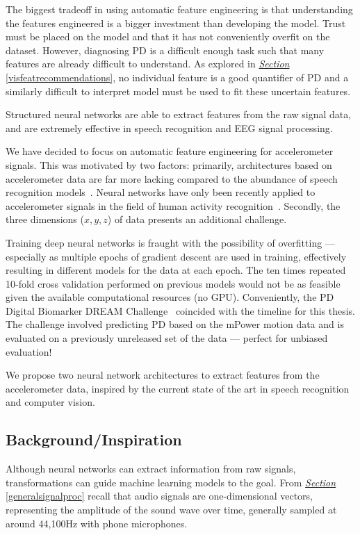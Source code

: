 \documentclass[12pt, twoside]{book}
\begin{document}
The biggest tradeoff in using automatic feature engineering is that understanding the features engineered is a bigger investment than developing the model. Trust must be placed on the model and that it has not conveniently overfit on the dataset. However, diagnosing PD is a difficult enough task such that many features are already difficult to understand. As explored in \textit{\hyperref[visfeatrecommendations]{Section}} \ref{visfeatrecommendations}, no individual feature is a good quantifier of PD and a similarly difficult to interpret model must be used to fit these uncertain features.

\begin{highlight}
	Structured neural networks are able to extract features from the raw signal data, and are extremely effective in speech recognition and EEG signal processing.
\end{highlight}

We have decided to focus on automatic feature engineering for accelerometer signals. This was motivated by two factors: primarily, architectures based on accelerometer data are far more lacking compared to the abundance of speech recognition models~\cite{convlstm, wavenet}. Neural networks have only been recently applied to accelerometer signals in the field of human activity recognition~\cite{deepconvlstm}. Secondly, the three dimensions ($x,y,z$) of data presents an additional challenge.

Training deep neural networks is fraught with the possibility of overfitting --- especially as multiple epochs of gradient descent are used in training, effectively resulting in different models for the data at each epoch. The ten times repeated 10-fold cross validation performed on previous models would not be as feasible given the available computational resources (no GPU). Conveniently, the PD Digital Biomarker DREAM Challenge~\cite{dreamchallengeinfo} coincided with the timeline for this thesis. The challenge involved predicting PD based on the mPower motion data and is evaluated on a previously unreleased set of the data --- perfect for unbiased evaluation!

We propose two neural network architectures to extract features from the accelerometer data, inspired by the current state of the art in speech recognition and computer vision. 
\subsection{Background/Inspiration}
Although neural networks can extract information from raw signals, transformations can guide machine learning models to the goal. From \textit{\hyperref[generalsignalproc]{Section}} \ref{generalsignalproc} recall that audio signals are one-dimensional vectors, representing the amplitude of the sound wave over time, generally sampled at around 44,100Hz with phone microphones. 
\end{document}
